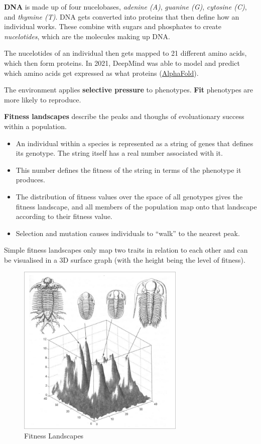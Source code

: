\textbf{DNA} is made up of four nucelobases, \textit{adenine (A)}, \textit{guanine (G)}, \textit{cytosine (C)}, and \textit{thymine (T)}. DNA gets converted into proteins that then define how an individual works. These combine with sugars and phosphates to create \textit{nucelotides}, which are the molecules making up DNA.

The nucelotides of an individual then gets mapped to 21 different amino acids, which then form proteins. In 2021, DeepMind was able to model and predict which amino acids get expressed as what proteins (\href{https://deepmind.com/research/open-source/alphafold-protein-structure-database}{AlphaFold}).

The environment applies \textbf{selective pressure} to phenotypes. \textbf{Fit} phenotypes are more likely to reproduce.

\textbf{Fitness landscapes} describe the peaks and thoughs of evoluationary success within a population.

\begin{itemize}
    \item An individual within a species is represented as a string of genes that defines its genotype. The string itself has a real number associated with it.
    \item This number defines the fitness of the string in terms of the phenotype it produces.
    \item The distribution of fitness values over the space of all genotypes gives the fitness landscape, and all members of the population map onto that landscape according to their fitness value.
    \item Selection and mutation causes individuals to ``walk'' to the nearest peak.
\end{itemize}

Simple fitness landscapes only map two traits in relation to each other and can be visualised in a 3D surface graph (with the height being the level of fitness).

\begin{figure}[ht]
    \centering
    \includegraphics[width=8cm]{fitnesslandscape.png}
    \caption{Fitness Landscapes}
    \label{fig:fitness}
\end{figure}

